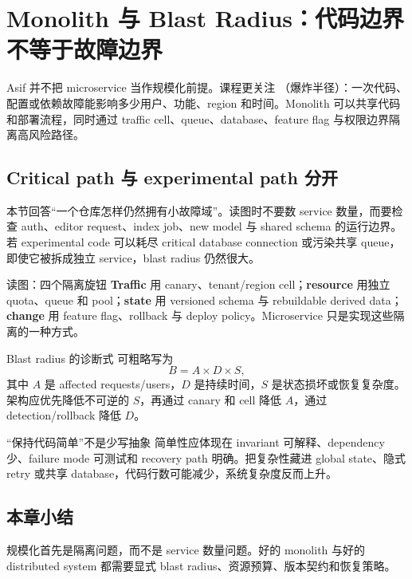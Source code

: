 \section{Monolith 与 Blast Radius：代码边界不等于故障边界}

Asif 并不把 microservice 当作规模化前提。课程更关注 （爆炸半径）：一次代码、配置或依赖故障能影响多少用户、功能、region 和时间。Monolith 可以共享代码和部署流程，同时通过 traffic cell、queue、database、feature flag 与权限边界隔离高风险路径。

\subsection{Critical path 与 experimental path 分开}

本节回答“一个仓库怎样仍然拥有小故障域”。读图时不要数 service 数量，而要检查 auth、editor request、index job、new model 与 shared schema 的运行边界。若 experimental code 可以耗尽 critical database connection 或污染共享 queue，即使它被拆成独立 service，blast radius 仍然很大。


\begin{knowledgebox}{读图：四个隔离旋钮}
\textbf{Traffic} 用 canary、tenant/region cell；\textbf{resource} 用独立 quota、queue 和 pool；\textbf{state} 用 versioned schema 与 rebuildable derived data；\textbf{change} 用 feature flag、rollback 与 deploy policy。Microservice 只是实现这些隔离的一种方式。
\end{knowledgebox}

\begin{importantbox}{Blast radius 的诊断式}
可粗略写为
\[
B=A\times D\times S,
\]
其中 $A$ 是 affected requests/users，$D$ 是持续时间，$S$ 是状态损坏或恢复复杂度。架构应优先降低不可逆的 $S$，再通过 canary 和 cell 降低 $A$，通过 detection/rollback 降低 $D$。
\end{importantbox}

\begin{warningbox}{“保持代码简单”不是少写抽象}
简单性应体现在 invariant 可解释、dependency 少、failure mode 可测试和 recovery path 明确。把复杂性藏进 global state、隐式 retry 或共享 database，代码行数可能减少，系统复杂度反而上升。
\end{warningbox}


\subsection{本章小结}

规模化首先是隔离问题，而不是 service 数量问题。好的 monolith 与好的 distributed system 都需要显式 blast radius、资源预算、版本契约和恢复策略。

